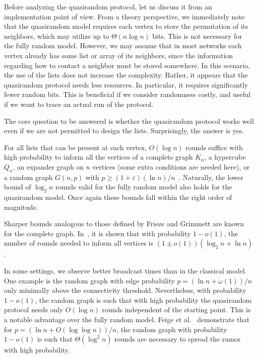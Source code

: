 \documentclass[12pt]{article}
\newcommand{\eps}{\varepsilon}
\begin{document}
{Before analyzing the quasirandom protocol, let us discuss it from an implementation
point of view. From a theory perspective, we immediately note that the quasirandom model requires each
vertex to store the permutation of its neighbors, which may utilize up to $\Theta(n \log n)$ bits.
This is not necessary for the fully random model. However, we may assume that in
most networks each vertex already has some list or array of its neighbors, since the
information regarding how to contact a neighbor must be stored somewhere. In this scenario, the use of the lists does not increase the complexity. Rather, it appears that the
quasirandom protocol needs less resources. In particular, it requires significantly fewer random
bits. This is beneficial if we consider randomness costly, and useful if we want to trace an
actual run of the protocol.

The core question to be answered is whether the quasirandom protocol
works well even if we are not permitted to design the lists. Surprisingly, the answer
is yes.

For all lists that can be present at each vertex, $O(\log n)$ rounds suffice with high probability to inform all the vertices of a complete graph $K_n$, a hypercube $Q_n$, an expander graph on $n$ vertices (some extra conditions are needed here), or a random graph $G(n,p)$ with $p \ge (1 + \eps) (\ln n)/n$~\cite{DFS08,DFS09}. Naturally, the lower bound of $\log_2n$ rounds valid for the fully random model also holds for the quasirandom model. Once again these bounds fall within the right order of magnitude. 

Sharper bounds analogous to those defined by Frieze and Grimmett are known for the complete graph.
In~\cite{TightBounds}, it is shown that with probability $1 - o(1)$, the number of rounds needed to inform all vertices is $(1 \pm o(1))(\log_2 n  + \ln n )$. 

In some settings, we observe better broadcast times than in the classical model. One example is the random graph with edge probability $p = (\ln n + \omega(1))/n$ only minimally above the connectivity threshold. Nevertheless, with probability $1 - o(1)$, the random graph is such that with high probability the quasirandom protocol needs only $O(\log n)$ rounds independent of the starting point. This is a notable advantage over the fully random model. Feige et al.~\cite{FPRU90} demonstrate that for $p = (\ln n  + O(\log\log n))/n$, the random graph with probability $1 - o(1)$ is such that $\Theta(\log^2 n )$ rounds are necessary to spread the rumor with high probability. 

}
\end{document}
